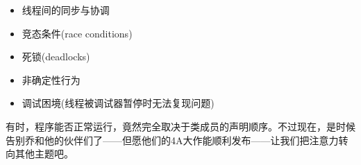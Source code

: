 \begin{itemize}
\item 
线程间的同步与协调

\item 
竞态条件(race conditions)

\item 
死锁(deadlocks)

\item 
非确定性行为

\item 
调试困境(线程被调试器暂停时无法复现问题)
\end{itemize}

有时，程序能否正常运行，竟然完全取决于类成员的声明顺序。不过现在，是时候告别乔和他的伙伴们了——但愿他们的4A大作能顺利发布——让我们把注意力转向其他主题吧。






















